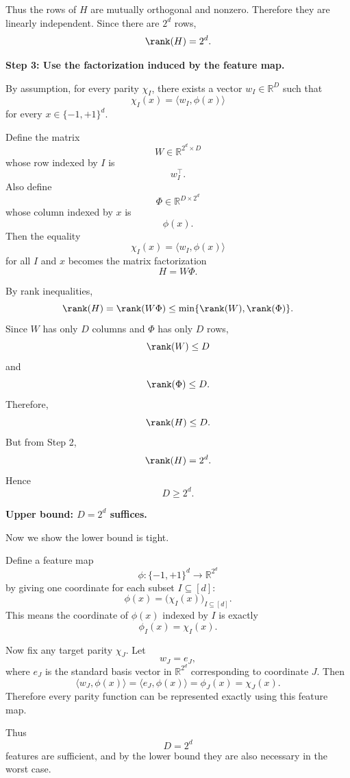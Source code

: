 \documentclass[11pt]{article}
\begin{document}
\begin{enumerate}
\begin{solutionbox}
    Thus the rows of $H$ are mutually orthogonal and nonzero. Therefore they are linearly
    independent. Since there are $2^d$ rows,
    \[
    \rank(H)=2^d.
    \]

    \medskip

    \textbf{Step 3: Use the factorization induced by the feature map.}

    By assumption, for every parity $\chi_I$, there exists a vector $w_I\in\mathbb{R}^D$ such
    that
    \[
    \chi_I(x)=\langle w_I,\phi(x)\rangle
    \]
    for every $x\in\{-1,+1\}^d$.

    Define the matrix
    \[
    W\in\mathbb{R}^{2^d\times D}
    \]
    whose row indexed by $I$ is
    \[
    w_I^\top.
    \]
    Also define
    \[
    \Phi\in\mathbb{R}^{D\times 2^d}
    \]
    whose column indexed by $x$ is
    \[
    \phi(x).
    \]
    Then the equality
    \[
    \chi_I(x)=\langle w_I,\phi(x)\rangle
    \]
    for all $I$ and $x$ becomes the matrix factorization
    \[
    H=W\Phi.
    \]

    By rank inequalities,
    \[
    \rank(H)=\rank(W\Phi)\le \min\{\rank(W),\rank(\Phi)\}.
    \]
    Since $W$ has only $D$ columns and $\Phi$ has only $D$ rows,
    \[
    \rank(W)\le D
    \]
    and
    \[
    \rank(\Phi)\le D.
    \]
    Therefore,
    \[
    \rank(H)\le D.
    \]
    But from Step 2,
    \[
    \rank(H)=2^d.
    \]
    Hence
    \[
    \boxed{
    D\ge2^d.
    }
    \]

    \medskip

    \textbf{Upper bound: $D=2^d$ suffices.}

    Now we show the lower bound is tight.

    Define a feature map
    \[
    \phi:\{-1,+1\}^d\to\mathbb{R}^{2^d}
    \]
    by giving one coordinate for each subset $I\subseteq[d]$:
    \[
    \phi(x)=\bigl(\chi_I(x)\bigr)_{I\subseteq[d]}.
    \]
    This means the coordinate of $\phi(x)$ indexed by $I$ is exactly
    \[
    \phi_I(x)=\chi_I(x).
    \]

    Now fix any target parity $\chi_J$. Let
    \[
    w_J=e_J,
    \]
    where $e_J$ is the standard basis vector in $\mathbb{R}^{2^d}$ corresponding to coordinate
    $J$. Then
    \[
    \langle w_J,\phi(x)\rangle
    =
    \langle e_J,\phi(x)\rangle
    =
    \phi_J(x)
    =
    \chi_J(x).
    \]
    Therefore every parity function can be represented exactly using this feature map.

    Thus
    \[
    \boxed{
    D=2^d
    }
    \]
    features are sufficient, and by the lower bound they are also necessary in the worst case.


\end{solutionbox}
\end{enumerate}
\end{document}
